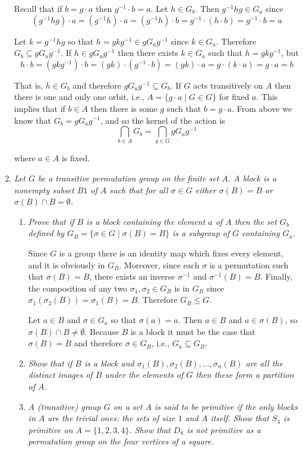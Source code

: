 \documentclass[letterpaper, 11pt]{article}
\begin{document}
\begin{enumerate}
Recall that if $b = g \cdot a$ then $g^{-1} \cdot b = a$.  Let $h \in G_b$.  Then $g^{-1}hg \in G_a$ since
\[
(g^{-1}hg) \cdot a = (g^{-1}h) \cdot a = (g^{-1}h) \cdot b = g^{-1} \cdot (h \cdot b) = g^{-1} \cdot b = a
\]

Let $k = g^{-1}hg$ so that $h = gkg^{-1} \in gG_ag^{-1}$ since $k \in G_a$.  Therefore $G_b \subseteq gG_ag^{-1}$.  If $h \in gG_ag^{-1}$ then there exists $k \in G_a$ such that $h = gkg^{-1}$, but
\[
h \cdot b = (gkg^{-1}) \cdot b = (gk) \cdot (g^{-1} \cdot b) = (gk) \cdot a = g \cdot ( k \cdot a) = g \cdot a = b
\]

That is, $h \in G_b$ and therefore $gG_ag^{-1} \subseteq G_b$.  If $G$ acts transitively on $A$ then there is one and only one orbit, i.e., $A = \{g \cdot a \mid G \in G\}$ for fixed $a$.  This implies that if $b \in A$ then there is some $g$ such that $b = g \cdot a$.  From above we know that $G_b = gG_ag^{-1}$, and so the kernel of the action is $$\bigcap_{b \in A} G_b = \bigcap_{g \in G} gG_ag^{-1}$$

where $a \in A$ is fixed.

\item \emph{Let $G$ be a transitive permutation group on the finite set $A$.  A \emph{block} is a nonempty subset $B1$ of $A$ such that for all $\sigma \in G$ either $\sigma(B)=B$ or $\sigma(B) \cap B = \emptyset$.}
\begin{enumerate}
\item \emph{Prove that if $B$ is a block containing the element $a$ of $A$ then the set $G_b$ defined by $G_B = \{\sigma \in G \mid \sigma(B) = B\}$ is a subgroup of $G$ containing $G_a$.}

Since $G$ is a group there is an identity map which fixes every element, and it is obviously in $G_B$.  Moreover, since each $\sigma$ is a permutation such that $\sigma(B) = B$, there exists an inverse $\sigma^{-1}$ and $\sigma^{-1}(B) = B$.  Finally, the composition of any two $\sigma_1, \sigma_2 \in G_B$ is in $G_B$ since $\sigma_1(\sigma_2(B)) = \sigma_1(B) = B$.  Therefore $G_B \leq G$.

Let $a \in B$ and $\sigma \in G_a$ so that $\sigma(a)=a$.  Then $a \in B$ and $a \in \sigma(B)$, so $\sigma(B) \cap B \neq \emptyset$.  Because $B$ is a block it must be the case that $\sigma(B)=B$ and therefore $\sigma \in G_B$, i.e., $G_a \subseteq G_B$.

\item \emph{Show that if $B$ is a block and $\sigma_1(B), \sigma_2(B),\ldots,\sigma_n(B)$ are all the distinct images of $B$ under the elements of $G$ then these form a partition of $A$.}
\item \emph{A (transitive) group $G$ on a set $A$ is said to be \emph{primitive} if the only blocks in $A$ are the trivial ones: the sets of size $1$ and $A$ itself.  Show that $S_4$ is primitive on $A=\{1,2,3,4\}$.  Show that $D_8$ is not primitive as a permutation group on the four vertices of a square.}


\end{enumerate}
\end{enumerate}
\end{document}

